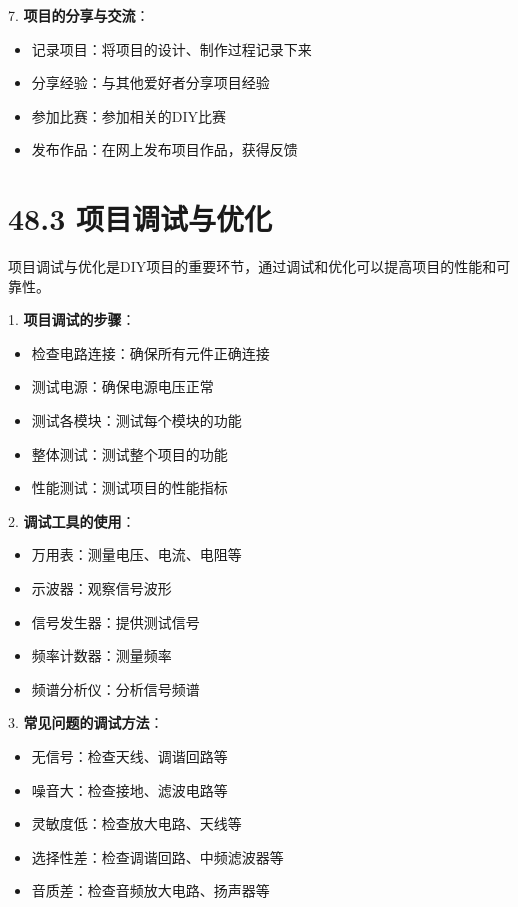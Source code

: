 \documentclass[12pt,UTF8]{ctexbook}
\begin{document}
7. \textbf{项目的分享与交流}：
   \begin{itemize}[leftmargin=3.5em]
   \item 记录项目：将项目的设计、制作过程记录下来
   \item 分享经验：与其他爱好者分享项目经验
   \item 参加比赛：参加相关的DIY比赛
   \item 发布作品：在网上发布项目作品，获得反馈
   \end{itemize}
\section*{48.3 项目调试与优化}

项目调试与优化是DIY项目的重要环节，通过调试和优化可以提高项目的性能和可靠性。

1. \textbf{项目调试的步骤}：
   \begin{itemize}[leftmargin=3.5em]
   \item 检查电路连接：确保所有元件正确连接
   \item 测试电源：确保电源电压正常
   \item 测试各模块：测试每个模块的功能
   \item 整体测试：测试整个项目的功能
   \item 性能测试：测试项目的性能指标
   \end{itemize}

2. \textbf{调试工具的使用}：
   \begin{itemize}[leftmargin=3.5em]
   \item 万用表：测量电压、电流、电阻等
   \item 示波器：观察信号波形
   \item 信号发生器：提供测试信号
   \item 频率计数器：测量频率
   \item 频谱分析仪：分析信号频谱
   \end{itemize}

3. \textbf{常见问题的调试方法}：
   \begin{itemize}[leftmargin=3.5em]
   \item 无信号：检查天线、调谐回路等
   \item 噪音大：检查接地、滤波电路等
   \item 灵敏度低：检查放大电路、天线等
   \item 选择性差：检查调谐回路、中频滤波器等
   \item 音质差：检查音频放大电路、扬声器等
   \end{itemize}
\end{document}
